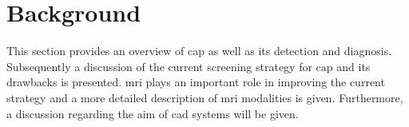 \section{Background} \label{sec:background}

This section provides an overview of \ac{cap} as well as its detection and diagnosis. %
Subsequently a discussion of the current screening strategy for \ac{cap} and its drawbacks is presented. \ac{mri} plays an important role in improving the current strategy and a more detailed description of \ac{mri} modalities is given. Furthermore, a discussion regarding the aim of \ac{cad} systems will be given.


